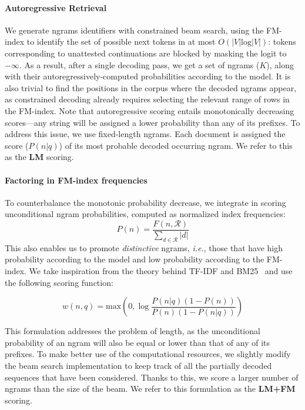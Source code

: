 \documentclass[11pt]{article}
\newcommand{\ie}{\textit{i.e.}}
\begin{document}
\paragraph{Autoregressive Retrieval}
\label{ssec:generating}

We generate ngrams identifiers with constrained beam search, using the FM-index to identify the set of possible next tokens in at most $O(|V| \text{log}|V|)$: tokens corresponding to unattested continuations are blocked by masking the logit to $-\infty$.
As a result, after a single decoding pass, we get a set of ngrams ($K$), along with their autoregressively-computed probabilities according to the model. It is also trivial to find the positions in the corpus where the decoded ngrams appear, as constrained decoding already requires selecting the relevant range of rows in the FM-index.
Note that autoregressive scoring entails monotonically decreasing scores---any string will be assigned a lower probability than any of its prefixes. To address this issue, we use fixed-length ngrams. Each document is assigned the score ($P(n|q)$) of its most probable decoded occurring ngram. 
We refer to this as the \textbf{LM} scoring. 

\paragraph{Factoring in FM-index frequencies}
To counterbalance the monotonic probability decrease, we integrate in scoring unconditional ngram probabilities, computed as normalized index frequencies:
\begin{equation}
    P(n) = \frac{F(n, \mathcal{R})}{\sum_{d \in \mathcal{R}} |d|}
\end{equation}
This also enables us to promote \textit{distinctive} ngrams, \ie, those that have high probability according to the model and low probability according to the FM-index. We take inspiration from the theory behind TF-IDF and BM25~\citep{robertson-zaragoza-2009-probabilistic} and use the following scoring function:

\begin{equation}
    w(n,q) = \text{max}( 0, \log \frac{P(n|q)(1 - P(n))}{P(n)(1 - P(n|q))})
\label{eq:ngram-score}
\end{equation}

\noindent
This formulation addresses the problem of length, as the unconditional probability of an ngram will also be equal or lower than that of any of its prefixes.
To make better use of the computational resources, we slightly modify the beam search implementation to keep track of all the partially decoded sequences that have been considered. Thanks to this, we score a larger number of ngrams than the size of the beam.
We refer to this formulation as the \textbf{LM+FM} scoring.
\end{document}
